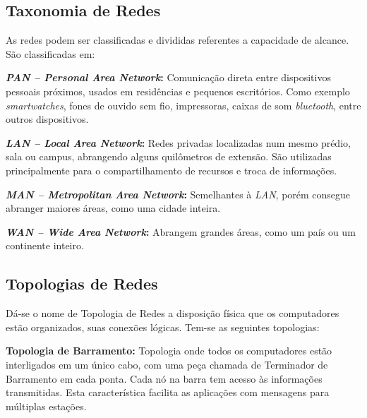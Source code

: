 \newpage\thispagestyle{empty}
\subsection{\textbf{Taxonomia de Redes}}
\par As redes podem ser classificadas e divididas referentes a capacidade de alcance. São classificadas em:

\par \textbf{\textit{PAN – Personal Area Network}:} Comunicação direta entre dispositivos pessoais próximos, usados em residências e pequenos escritórios. Como exemplo \textit{smartwatches}, fones de ouvido sem fio, impressoras, caixas de som \textit{bluetooth}, entre outros dispositivos.

\par \textbf{\textit{LAN – Local Area Network}:} Redes privadas localizadas num mesmo prédio, sala ou campus, abrangendo alguns quilômetros de extensão. São utilizadas principalmente para o compartilhamento de recursos e troca de informações.

\par \textbf{\textit{MAN – Metropolitan Area Network}:} Semelhantes à \textit{LAN}, porém consegue abranger maiores áreas, como uma cidade inteira.

\par \textbf{\textit{WAN – Wide Area Network}:} Abrangem grandes áreas, como um país ou um continente inteiro.

\newpage\thispagestyle{empty}
\subsection{\textbf{Topologias de Redes}}

\par Dá-se o nome de Topologia de Redes a disposição física que os computadores estão organizados, suas conexões lógicas. Tem-se as seguintes topologias:

\par \textbf{Topologia de Barramento:} Topologia onde todos os computadores estão interligados em um único cabo, com uma peça chamada de Terminador de Barramento em cada ponta. Cada nó na barra tem acesso às informações transmitidas. Esta característica facilita as aplicações com mensagens para múltiplas estações.

